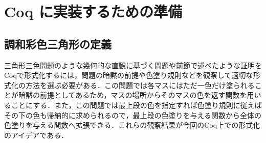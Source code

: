 \section{ Coq に実装するための準備}
\subsection{調和彩色三角形の定義}
三角形三色問題のような幾何的な直観に基づく問題や前節で述べたような証明をCoqで形式化するには，問題の暗黙の前提や色塗り規則などを観察して適切な形式化の方法を選ぶ必要がある．この問題では各マスにはただ一色だけ塗られることが暗黙の前提としてあるため，マスの場所からそのマスの色を返す関数を用いることにする．また，この問題では最上段の色を指定すれば色塗り規則に従えばその下の色も帰納的に求められるので，最上段の色塗りを与える関数から全体の色塗りを与える関数へ拡張できる．これらの観察結果が今回のCoq上での形式化のアイデアである．

